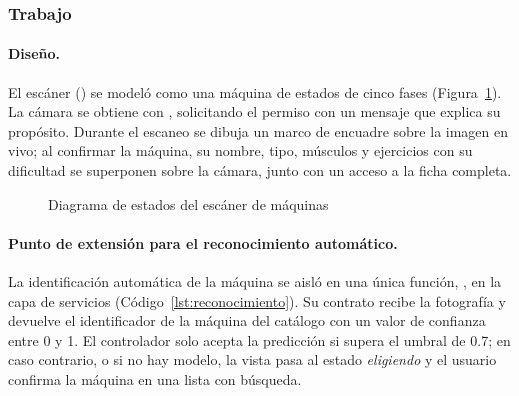 \subsubsection{Trabajo}

\paragraph{Diseño.} El escáner () se modeló como una
máquina de estados de cinco fases (Figura~\ref{fig:estados-escaner}). La
cámara se obtiene con , solicitando el permiso con un
mensaje que explica su propósito. Durante el escaneo se dibuja un marco de
encuadre sobre la imagen en vivo; al confirmar la máquina, su nombre, tipo,
músculos y ejercicios con su dificultad se superponen sobre la cámara, junto
con un acceso a la ficha completa.

\begin{figure}[H]
\centering
{}
\caption{Diagrama de estados del escáner de máquinas}
\label{fig:estados-escaner}
\end{figure}

\paragraph{Punto de extensión para el reconocimiento automático.} La
identificación automática de la máquina se aisló en una única función,
, en la capa de servicios
(Código~\ref{lst:reconocimiento}). Su contrato recibe la fotografía y devuelve
el identificador de la máquina del catálogo con un valor de confianza entre 0
y 1. El controlador solo acepta la predicción si supera el umbral de 0.7; en
caso contrario, o si no hay modelo, la vista pasa al estado \emph{eligiendo} y
el usuario confirma la máquina en una lista con búsqueda.


